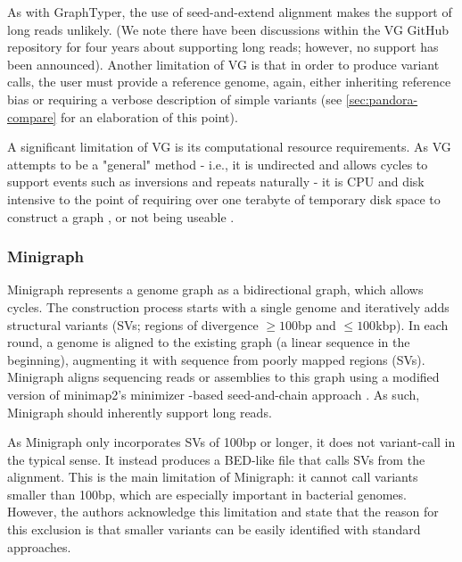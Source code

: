 As with GraphTyper, the use of seed-and-extend alignment makes the support of long reads unlikely. (We note there have been discussions within the VG GitHub repository for four years about supporting long reads; however, no support has been announced). Another limitation of VG is that in order to produce variant calls, the user must provide a reference genome, again, either inheriting reference bias or requiring a verbose description of simple variants (see \autoref{sec:pandora-compare} for an elaboration of this point).

A significant limitation of VG is its computational resource requirements. As VG attempts to be a "general" method - i.e., it is undirected and allows cycles to support events such as inversions and repeats naturally - it is CPU and disk intensive \cite{strainflair2021,gramtools2021,minigraph2020} to the point of requiring over one terabyte of temporary disk space to construct a graph \cite{gramtools2021}, or not being useable \cite{minigraph2020}.

\subsubsection{Minigraph}
Minigraph \cite{minigraph2020} represents a genome graph as a bidirectional graph, which allows cycles. The construction process starts with a single genome and iteratively adds structural variants (SVs; regions of divergence $\ge 100$bp and $\le 100$kbp). In each round, a genome is aligned to the existing graph (a linear sequence in the beginning), augmenting it with sequence from poorly mapped regions (SVs). Minigraph aligns sequencing reads or assemblies to this graph using a modified version of minimap2's minimizer \kmer{}-based seed-and-chain approach \cite{li2018}. As such, Minigraph should inherently support long reads.

As Minigraph only incorporates SVs of 100bp or longer, it does not variant-call in the typical sense. It instead produces a BED-like file that calls SVs from the alignment. This is the main limitation of Minigraph: it cannot call variants smaller than 100bp, which are especially important in bacterial genomes. However, the authors acknowledge this limitation and state that the reason for this exclusion is that smaller variants can be easily identified with standard approaches. 

